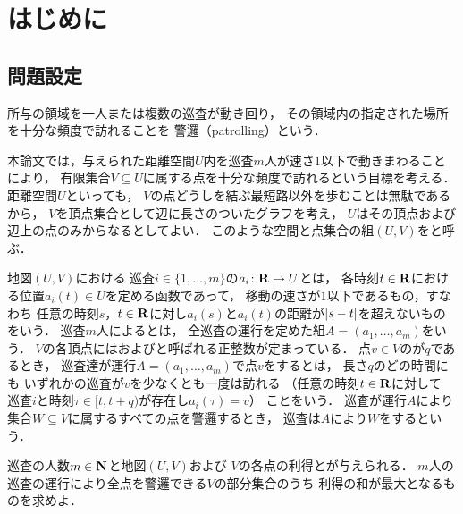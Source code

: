 \chapter{はじめに}
\label{chapter: introduction}

\section{問題設定}
\label{section: problemDefinition}
所与の領域を一人または複数の巡査が動き回り，
その領域内の指定された場所を十分な頻度で訪れることを
警邏（patrolling）という\cite{
  40021287065,
  chen2013fence,
  coene2011charlemagne,
  czyzowicz2011boundary,
  Dumitrescu:2014:CGC:2636805.2636822}．

本論文では，与えられた距離空間$U$内を巡査$m$人が速さ$1$以下で動きまわることにより，
有限集合$V \subseteq U$に属する点を十分な頻度で訪れるという目標を考える．
距離空間$U$といっても，
$V$の点どうしを結ぶ最短路以外を歩むことは無駄であるから，
$V$を頂点集合として辺に長さのついたグラフを考え，
$U$はその頂点および辺上の点のみからなるとしてよい．
このような空間と点集合の組$(U, V)$をと呼ぶ．

地図$(U, V)$における
巡査$i \in \{1, \ldots, m\}$の$a _i \colon \mathbf R \to U$とは，
各時刻$t \in \mathbf R$における位置$a _i (t) \in U$を定める函数であって，
移動の速さが$1$以下であるもの，すなわち
任意の時刻$s$，$t \in \mathbf R$に対し$a _i (s)$と$a _i (t)$の距離が$\lvert{s - t}\rvert$を超えないものをいう．
巡査$m$人によるとは，
全巡査の運行を定めた組$A = (a _1, \dots, a _m)$をいう．
$V$の各頂点にはおよびと呼ばれる正整数が定まっている．
点$v \in V$の{\maxIdletime}が$q$であるとき，
巡査達が運行$A = (a _1, \dots, a _m)$で点$v$をするとは，
長さ$q$のどの時間にも
いずれかの巡査が$v$を少なくとも一度は訪れる
（任意の時刻$t \in \mathbf R$に対して
巡査$i$と時刻$\tau \in [t, t + q)$が存在し$a _i (\tau) = v$）
ことをいう．
巡査が運行$A$により集合$W \subseteq V$に属するすべての点を警邏するとき，
巡査は$A$により$W$をするという．

\begin{patrollingProblem}
  巡査の人数$m \in \mathbf N$と地図$(U, V)$および
  $V$の各点の利得と{\maxIdletime}が与えられる．
  $m$人の巡査の運行により全点を警邏できる$V$の部分集合のうち
  利得の和が最大となるものを求めよ．
\end{patrollingProblem}

